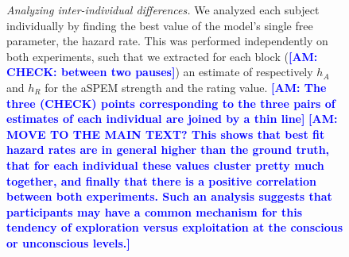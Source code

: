 \documentclass[12pt,english]{article}%
\newcommand{\seeFig}[1]{Figure~\ref{fig:#1}}
\newcommand{\AM}[1]{\textbf{\textcolor{blue}{[AM: #1]}}}
\begin{document}
\begin{figure}%
\caption{\emph{Analyzing inter-individual differences.} %
We analyzed each subject individually by finding
the best value of the model's single free parameter, the hazard rate.
This was performed independently on both experiments,
such that we extracted for each block (\AM{CHECK: between two pauses})
an estimate of respectively $h_A$ and $h_R$
for the aSPEM strength and the rating value. \AM{The three (CHECK) points corresponding to
the three pairs of estimates of each individual are joined by a thin line}
\AM{MOVE TO THE MAIN TEXT? This shows that best fit hazard rates are in general higher than the ground truth,
that for each individual these values cluster pretty much together,
and finally that there is a positive correlation between both experiments.
Such an analysis suggests that participants may have
a common mechanism for this tendency of exploration versus exploitation
at the conscious or unconscious levels.}
}
\label{fig:results_inter}
\end{figure}
\end{document}
